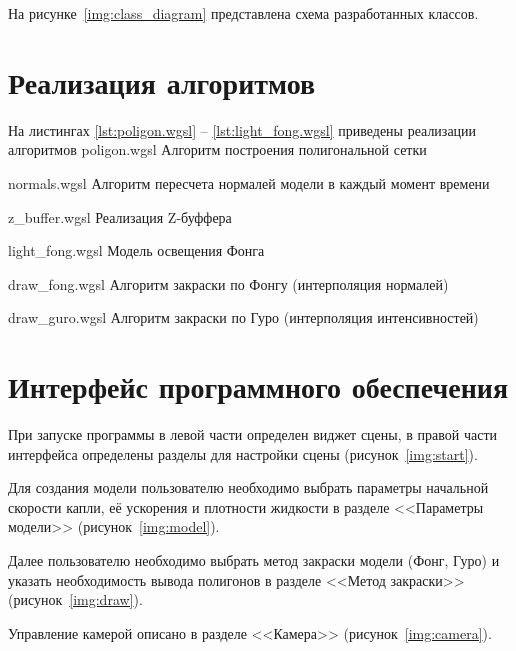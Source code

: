 На рисунке~\ref{img:class_diagram} представлена схема разработанных классов.



\section{Реализация алгоритмов}
На листингах \ref{lst:poligon.wgsl} -- \ref{lst:light_fong.wgsl} приведены реализации алгоритмов
\newpage
{}
    {poligon.wgsl}
    {Алгоритм построения полигональной сетки}

\newpage

    {normals.wgsl}
    {Алгоритм пересчета нормалей модели в каждый момент времени}

\newpage

    {z_buffer.wgsl}
    {Реализация Z-буффера}

    {light_fong.wgsl}
    {Модель освещения Фонга}

\newpage

    {draw_fong.wgsl}
    {Алгоритм закраски по Фонгу (интерполяция нормалей)}

\newpage
    {draw_guro.wgsl}
    {Алгоритм закраски по Гуро (интерполяция интенсивностей)}

\newpage

\section{Интерфейс программного обеспечения}

При запуске программы в левой части определен виджет сцены, 
в правой части интерфейса определены разделы для настройки сцены (рисунок~\ref{img:start}).

\newpage

Для создания модели пользователю необходимо выбрать параметры начальной скорости капли, её ускорения и плотности жидкости в разделе <<Параметры модели>> (рисунок~\ref{img:model}).

Далее пользователю необходимо выбрать метод закраски модели (Фонг, Гуро) и указать необходимость вывода полигонов в разделе <<Метод закраски>> (рисунок~\ref{img:draw}).

Управление камерой описано в разделе <<Камера>> (рисунок~\ref{img:camera}).

